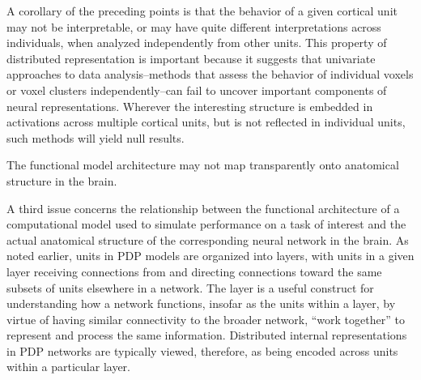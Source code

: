 \begin{APAenumerate}
A corollary of the preceding points is that the behavior of a given cortical unit may not be interpretable, or may have quite different interpretations across individuals, when analyzed independently from other units. 
This property of distributed representation is important because it suggests that univariate approaches to data analysis--methods that assess the behavior of individual voxels or voxel clusters independently--can fail to uncover important components of neural representations. Wherever the interesting structure is embedded in activations across multiple cortical units, but is not reflected in individual units, such methods will yield null results.

\item The functional model architecture may not map transparently onto anatomical structure in the brain.

 A third issue concerns the relationship between the functional architecture of a computational model used to simulate performance on a task of interest and the actual anatomical structure of the corresponding neural network in the brain.  As noted earlier, units in PDP models are organized into layers, with units in a given layer receiving connections from and directing connections toward the same subsets of units elsewhere in a network. The layer is a useful construct for understanding how a network functions, insofar as the units within a layer, by virtue of having similar connectivity to the broader network, ``work together'' to represent and process the same information. Distributed internal representations in PDP networks are typically viewed, therefore, as being encoded across units within a particular layer.  


\end{APAenumerate}
